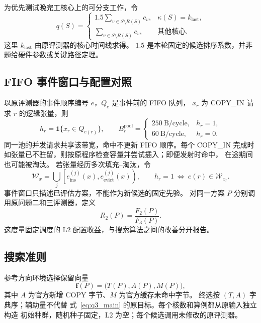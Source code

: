 为优先测试晚完工核心上的可分支工作，令
\begin{equation}
 q(S)=
 \begin{cases}
  1.5\sum_{v\in S\setminus R(S)}c_v,
   &\kappa(S)=k_{\mathrm{last}},\\
  \sum_{v\in S\setminus R(S)}c_v,
   &\text{其他核心}.
 \end{cases}
 \label{eq:q3_branch_priority}
\end{equation}
这里 $k_{\mathrm{last}}$ 由原评测器的核心时间线求得。
$1.5$ 是本轮固定的候选排序系数，并非题给硬件参数或关键路径定理。

\subsection{FIFO 事件窗口与配置对照}
以原评测器的事件顺序编号 $e$，$Q_e$ 是事件前的 FIFO 队列，
$x_r$ 为 COPY\_IN 请求 $r$ 的逻辑张量，则
\begin{equation}
 h_r=\mathbf 1\{x_r\in Q_{e(r)}\},\qquad
 B_r^{\mathrm{pool}}=
 \begin{cases}
 250~\mathrm{B/cycle},&h_r=1,\\
 60~\mathrm{B/cycle},&h_r=0.
 \end{cases}
 \label{eq:q3_cache_path}
\end{equation}
同一池的并发请求共享该带宽，命中不更新 FIFO 顺序。每个 COPY\_IN
完成时如张量已不驻留，则按原程序检查容量并尝试插入；即便发射时命中，
在途期间也可能被淘汰。
若张量经历多次填充--淘汰，令
\begin{equation}
 \mathcal W_x=
 \bigcup_j
 \left[e_{\mathrm{ins}}^{(j)}(x),
       e_{\mathrm{evict}}^{(j)}(x)\right),
 \qquad
 h_r=1\ \Longleftrightarrow\ e(r)\in\mathcal W_{x_r}.
 \label{eq:q3_fifo_window}
\end{equation}
事件窗口只描述已评估方案，不能作为新候选的固定先验。
对同一方案 $P$ 分别调用原问题二和三评测器，定义
\begin{equation}
 R_2(P)=\frac{F_2(P)}{F_3(P)}.
 \label{eq:q3_l2_paired}
\end{equation}
这度量固定调度的 L2 配置收益，与搜索算法之间的改善分开报告。

\subsection{搜索准则}
参考方向环境选择保留向量
\begin{equation}
 \mathbf f(P)=\bigl(T(P),A(P),M(P)\bigr),
 \label{eq:q3_search_vector}
\end{equation}
其中 $A$ 为官方新增 COPY 字节、$M$ 为官方缓存未命中字节。
终选按 $(T,A)$ 字典序；辅助量不代替
式~\eqref{eq:q3_main} 的原目标。每个核数和算例都从原输入独立构造
初始种群，随机种子固定，L2 为空；每个候选调用未修改的原评测器。
